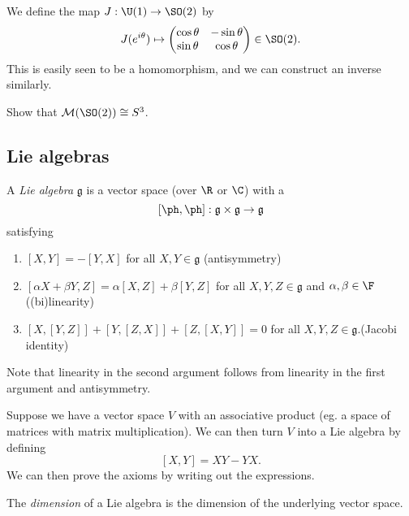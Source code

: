 \documentclass[a4paper]{article}
\begin{document}
\begin{eg}
  We define the map $J: \U(1) \to \SO(2)$ by
  \[
    J(e^{i\theta}) \mapsto
    \begin{pmatrix}
      \cos \theta & -\sin \theta\\
      \sin \theta & \cos \theta
    \end{pmatrix} \in \SO(2).
  \]
  This is easily seen to be a homomorphism, and we can construct an inverse similarly.
\end{eg}

\begin{ex}
  Show that $\mathcal{M}(\SO(2)) \cong S^3$.
\end{ex}

\subsection{Lie algebras}
\begin{defi}
  A \emph{Lie algebra} $\mathfrak{g}$ is a vector space (over $\R$ or $\C$) with a 
  \[
    [\ph,\ph] : \mathfrak{g} \times \mathfrak{g} \to \mathfrak{g}
  \]
  satisfying
  \begin{enumerate}
    \item $[X, Y] = -[Y, X]$ for all $X, Y \in \mathfrak{g}$ \hfill(antisymmetry)
    \item $[\alpha X + \beta Y, Z] = \alpha [X, Z] + \beta [Y, Z]$ for all $X, Y, Z \in \mathfrak{g}$ and $\alpha, \beta \in \F$ \hfill((bi)linearity)
    \item $[X, [Y, Z]] + [Y, [Z, X]] + [Z, [X, Y]] = 0$ for all $X, Y, Z \in \mathfrak{g}$.\hfill(Jacobi identity)
  \end{enumerate}
  Note that linearity in the second argument follows from linearity in the first argument and antisymmetry.
\end{defi}

\begin{eg}
  Suppose we have a vector space $V$ with an associative product (eg. a space of matrices with matrix multiplication). We can then turn $V$ into a Lie algebra by defining
  \[
    [X, Y] = XY - YX.
  \]
  We can then prove the axioms by writing out the expressions.
\end{eg}

\begin{defi}
  The \emph{dimension} of a Lie algebra is the dimension of the underlying vector space.
\end{defi}
\end{document}
